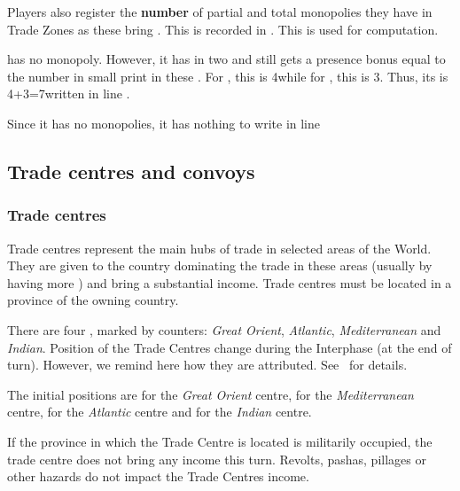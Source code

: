 \aparag Players also register the \textbf{number} of partial and total
monopolies they have in Trade Zones as these bring \VPs. This is
recorded in . This is used
for \VPs computation.

\begin{exemple}
  \POR has no monopoly. However, it has \TradeFLEET in two \STZ and
  still gets a presence bonus equal to the number in small print in
  these \STZ. For , this is 4\ducats while for
  , this is 3\ducats. Thus, its  is 4+3=7\ducats written in line .

  Since it has no monopolies, it has nothing to write in line
\end{exemple}

\subsection{Trade centres and convoys}
\subsubsection{Trade centres}
\aparag Trade centres represent the main hubs of trade in selected areas
of the World. They are given to the country dominating the trade in
these areas (usually by having more \TradeFLEET) and bring a substantial
income. Trade centres must be located in a province of the owning
country.

\aparag There are four , marked by counters:
\emph{Great Orient}, \emph{Atlantic}, \emph{Mediterranean} and
\emph{Indian}.
\bparag Position of the Trade Centres change during the Interphase (at
the end of turn). However, we remind here how they are attributed.
See~ for details.

\aparag The initial positions are \provinceNil for the \emph{Great
  Orient} centre, \provinceVeneto for the \emph{Mediterranean} centre,
\provinceVlaandern for the \emph{Atlantic} centre and \villeDiu for
the \emph{Indian} centre.

\aparag If the province in which the Trade Centre is located is
militarily occupied, the trade centre does not bring any income this
turn.
\bparag Revolts, pashas, pillages or other hazards do not impact the
Trade Centres income.

